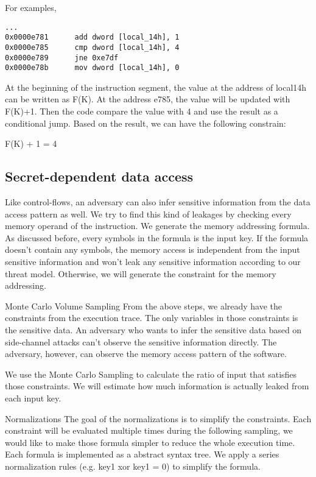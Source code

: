 For examples,

\begin{lstlisting}
...
0x0000e781      add dword [local_14h], 1
0x0000e785      cmp dword [local_14h], 4
0x0000e789      jne 0xe7df
0x0000e78b      mov dword [local_14h], 0

\end{lstlisting}

At the beginning of the instruction segment, the value at the address of local14h can be written as F(K). At the address e785, the value will be updated with F(K)+1. Then the code compare the value with 4 and use the result as a conditional jump. Based on the result, we can have the following constrain:

F(K) + 1 = 4
 
\subsection{Secret-dependent data access}
Like control-flows, an adversary can also infer sensitive information from the data access pattern as well. We try to find this kind of leakages by checking every memory operand of the instruction. We generate the memory addressing formula. As discussed before, every symbols in the formula is the input key. If the formula doesn’t contain any symbols, the memory access is independent from the input sensitive information and won’t leak any sensitive information according to our threat model. Otherwise, we will generate the constraint for the memory addressing. 


Monte Carlo Volume Sampling
From the above steps, we already have the constraints from the execution trace. The only variables in those constraints is the sensitive data. An adversary who wants to infer the sensitive data based on side-channel attacks can’t observe the sensitive information directly. The adversary, however, can observe the memory access pattern of the software.  

We use the Monte Carlo Sampling to calculate the ratio of input that satisfies those constraints.
We will estimate how much information is actually leaked from each input key.

Normalizations
The goal of the normalizations is to simplify the constraints. Each constraint will be evaluated multiple times during the following sampling, we would like to make those formula simpler to reduce the whole execution time.  Each formula is implemented as a abstract syntax tree. We apply a series normalization rules (e.g. key1 xor key1 = 0) to simplify the formula.


